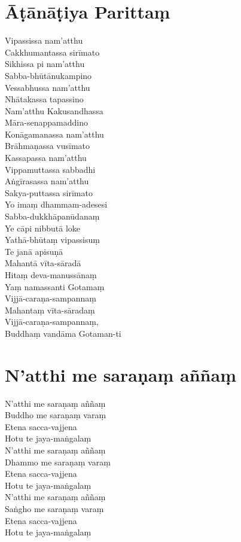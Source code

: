 \clearpage

\chapter{Āṭānāṭiya Parittaṃ}%

\begin{paritta}
Vipassissa nam'atthu\\
Cakkhumantassa sirīmato\\
Sikhissa pi nam'atthu\\
Sabba-bhūtānukampino\\
Vessabhussa nam'atthu\\
Nhātakassa tapassino\\
Nam'atthu Kakusandhassa\\
Māra-senappamaddino\\
Konāgamanassa nam'atthu\\
Brāhmaṇassa vusīmato\\
Kassapassa nam'atthu\\
Vippamuttassa sabbadhi\\
Aṅgīrasassa nam'atthu\\
Sakya-puttassa sirīmato\\
Yo imaṃ dhammam-adesesi\\
Sabba-dukkhāpanūdanaṃ\\
Ye cāpi nibbutā loke\\
Yathā-bhūtaṃ vipassisuṃ\\
Te janā apisuṇā\\
Mahantā vīta-sāradā\\
Hitaṃ deva-manussānaṃ\\
Yaṃ namassanti Gotamaṃ\\
Vijjā-caraṇa-sampannaṃ\\
Mahantaṃ vīta-sāradaṃ\\
Vijjā-caraṇa-sampannaṃ,\\
Buddhaṃ vandāma Gotaman-ti
\end{paritta}

\clearpage

\chapter{N'atthi me saraṇaṃ aññaṃ}%

\begin{paritta}
N'atthi me saraṇaṃ aññaṃ\\
Buddho me saraṇaṃ varaṃ\\
Etena sacca-vajjena\\
Hotu te jaya-maṅgalaṃ\\
N'atthi me saraṇaṃ aññaṃ\\
Dhammo me saraṇaṃ varaṃ\\
Etena sacca-vajjena\\
Hotu te jaya-maṅgalaṃ\\
N'atthi me saraṇaṃ aññaṃ\\
Saṅgho me saraṇaṃ varaṃ\\
Etena sacca-vajjena\\
Hotu te jaya-maṅgalaṃ
\end{paritta}


